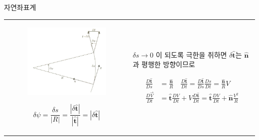   
  
   
\begin{frame}[t]{자연좌표계}
 	\begin{tabular}{ll}
 		\begin{minipage}[t]{0.35\textwidth}\scriptsize
 			\begin{figure}[t]
 				\includegraphics[width=\textwidth]{./images/SN1}
 			\end{figure}
 			$$ {\displaystyle {
 				\delta \psi=\frac{\delta s}{|R|}=\frac{|\delta \boldsymbol{\hat{t}}|}{|\boldsymbol{\hat{t}}|}
 				=|\delta \boldsymbol{\hat{t}}|
 			}}		$$
 			
 		\end{minipage}	
 		&
 		\begin{minipage}[t]{0.6\textwidth} \scriptsize
 			$\delta s \rightarrow 0$ 이 되도록 극한을 취하면 $\delta \boldsymbol{\hat t }$는 $\boldsymbol{\hat n }$과 평행한 방향이므로
 			
	 		$$	{\displaystyle{
					\begin{aligned}
	 					\frac{D \boldsymbol{\hat{t}}}{D s}&=\frac{\boldsymbol{\hat{n}}}{R}	\quad	\frac{D \boldsymbol{\hat{t}}}{D t}=\frac{D \boldsymbol{\hat{t}}}{D s}
			 				\frac{D s }{D t}	= \frac{\boldsymbol{\hat{n}}}{R}V\\
		 				\frac{D \vec{V}}{D t}&=\boldsymbol{\hat{t}} \frac{D V}{D t}+V \frac{D \boldsymbol{\hat{t}}}{D t}=\boldsymbol{\hat{t}} \frac{D V}{D t}+\boldsymbol {\hat{n}} \frac{V^{2}}{R}
					\end{aligned}
	 		}}$$


\end{minipage}
\end{tabular}
\end{frame}
